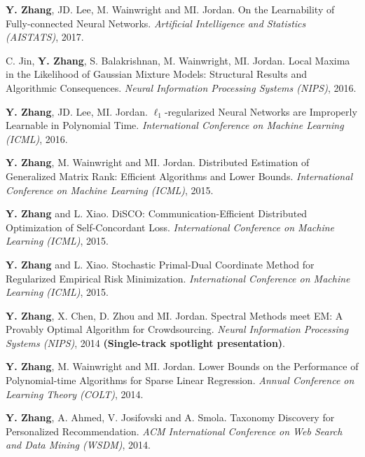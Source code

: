 \documentclass{res} %
\begin{document}
\begin{resume}
\begin{enumerate}[label={[C\arabic*]}, ref={C\arabic*}]
\item \textbf{Y. Zhang}, JD. Lee, M. Wainwright and MI. Jordan. On the Learnability of Fully-connected Neural Networks.
\emph{Artificial Intelligence and Statistics (AISTATS)}, 2017. \label{on-the-learnability-aistats17}

\item C. Jin, {\bf Y. Zhang}, S. Balakrishnan, M. Wainwright, MI. Jordan.  
Local Maxima in the Likelihood of Gaussian Mixture Models: Structural Results and Algorithmic Consequences.
\emph{Neural Information Processing Systems (NIPS)}, 2016. \label{local-nips16}

\item \textbf{Y. Zhang}, JD. Lee, MI. Jordan. $\ell_1$-regularized Neural Networks are Improperly Learnable in Polynomial Time.
\emph{International Conference on Machine Learning (ICML)}, 2016. \label{l1-icml16}

\item \textbf{Y. Zhang}, M. Wainwright and MI. Jordan. Distributed Estimation of Generalized Matrix Rank: Efficient Algorithms and Lower Bounds.
\emph{International Conference on Machine Learning (ICML)}, 2015. \label{distributed-icml15}

\item \textbf{Y. Zhang} and L. Xiao. DiSCO: Communication-Efficient Distributed Optimization of Self-Concordant Loss.
\emph{International Conference on Machine Learning (ICML)}, 2015. \label{communication-icml15}

\item \textbf{Y. Zhang} and L. Xiao. Stochastic Primal-Dual Coordinate Method for Regularized Empirical Risk Minimization.
\emph{International Conference on Machine Learning (ICML)}, 2015.\label{stochastic-icml15}

\item \textbf{Y. Zhang}, X. Chen, D. Zhou and MI. Jordan. Spectral Methods meet EM: A Provably Optimal Algorithm for Crowdsourcing.
\emph{Neural Information Processing Systems (NIPS)}, 2014 {\bf (Single-track spotlight presentation)}.\label{spectral-nips14}

\item \textbf{Y. Zhang}, M. Wainwright and MI. Jordan. Lower Bounds on the Performance of Polynomial-time Algorithms for Sparse Linear Regression. \emph{Annual Conference on Learning Theory (COLT)}, 2014. \label{lower-colt14}

\item \textbf{Y. Zhang}, A. Ahmed, V. Josifovski and A. Smola. Taxonomy Discovery for Personalized Recommendation. \emph{ACM International Conference on Web Search and Data Mining (WSDM)}, 2014. \label{taxonomy-wsdm14}


\end{enumerate}
\end{resume}
\end{document}
